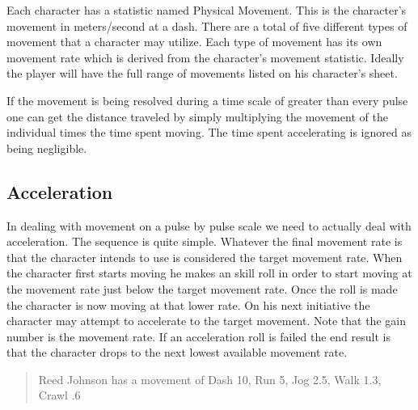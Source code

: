 Each character has a statistic named Physical Movement. This is the character's
movement in meters/second at a dash. There are a total of five different types
of movement that a character may utilize. Each type of movement has its own
movement rate which is derived from the character's movement statistic. 
Ideally the player will have the full range of movements listed on his 
character's sheet. 



If the movement is being resolved during a time scale of greater than every
pulse one can get the distance traveled by simply multiplying the movement 
of the individual times the time spent moving. The time spent accelerating
is ignored as being negligible.


\subsection{Acceleration}


In dealing with movement on a pulse by pulse scale we need to actually
deal with acceleration. The sequence is quite simple. Whatever the
final movement  rate is that the character intends to use is considered
the target movement rate. When the character first starts moving he
makes an skill roll in order to start moving at the movement
rate just below the target movement rate. Once the roll is made the
character is now moving at that lower rate. On his next  initiative the
character may attempt to accelerate to the target movement. Note  that
the gain number is the movement rate. If an acceleration roll is failed
the end result is that the character drops to the next lowest available
movement  rate. 

\begin{quotation}
Reed Johnson has a movement of Dash 10, Run 5, Jog 2.5, Walk 1.3, Crawl .6
\end{quotation}

